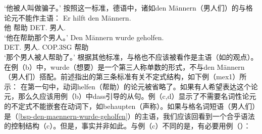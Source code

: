 \glt `他被人叫做骗子。'
\zl
按照这一标准，德语中，诸如den Männern（男人们）的与格论元不能作主语：
\eal
\ex 
\gll Er hilft den Männern.\\
	 他 帮助 DET.\dat{} 男人.\dat{}\\
\glt `他在帮助那个男人。'
\ex
\label{bsp-den-maennern-wurde-geholfen}
\gll Den Männern wurde geholfen.\\
	 DET.\dat{} 男人.\dat{} COP.3SG 帮助\\
\glt `那个男人被人帮助了。'
\zl
根据其他标准，与格也不应该被看作是主语（如\citet{Reis82}的观点）。在例（b）中，wurde（想要）是一个第三人称单数的形式，不与den Männern（男人们）搭配。前述指出的第三条标准有关不定式结构，如下例（mex{1}）所示：
\eal
{}
\zl
%
在第一句中，动词helfen（帮助）的论元被省略了。如果有人希望表达这个论元，那么久应该用例（b）中dass引导的从句。例（c,d）显示了不需要名词性论元的不定式不能嵌套在动词下，如behaupten（声称）。如果与格名词短语（男人们）是（\ref{bsp-den-maennern-wurde-geholfen}）的主语，我们应该回看到一个合乎语法的控制结构（c）。但是，事实并非如此。与例（c）不同的是，有必要用例（）：
